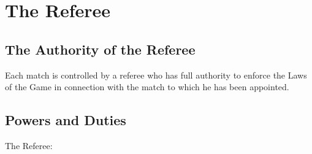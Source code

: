 \section{The Referee}\label{sec:referee}

\subsection{The Authority of the Referee}
Each match is controlled by a referee who has full authority to enforce the Laws of the Game in connection with the match to which he has been appointed.

\subsection{Powers and Duties}
The Referee:

